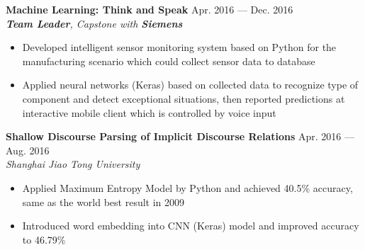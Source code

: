 \documentclass[margin,line,letterpaper]{res}
\begin{document}
\begin{resume}
{
\small
{\bf Machine Learning: Think and Speak} \hfill Apr. 2016 --- Dec. 2016\\
{\it \textbf{Team Leader}, Capstone with {\bf Siemens}}
}
\begin{itemize}
\setlength{\itemsep}{0pt}
\setlength{\parskip}{0pt}
\setlength{\parsep}{0pt}
\item {\small Developed intelligent sensor monitoring system based on Python for the manufacturing scenario which could collect sensor data to database}
\item {\small Applied neural networks (Keras) based on collected data to recognize type of component and detect exceptional situations, then reported predictions at interactive mobile client which is controlled by voice input}
\end{itemize}
\vspace{-.1 in}
{
\small
{\bf Shallow Discourse Parsing of Implicit Discourse Relations} \hfill Apr. 2016 ---  Aug. 2016\\
{\it Shanghai Jiao Tong University}
}
\begin{itemize}
\setlength{\itemsep}{0pt}
\setlength{\parskip}{0pt}
\setlength{\parsep}{0pt}
\item {\small Applied Maximum Entropy Model by Python and achieved 40.5\% accuracy, same as the world best result in 2009}
\item {\small Introduced word embedding into CNN (Keras) model and improved accuracy to 46.79\%}
\end{itemize}
\vspace{-.1 in}


\end{resume}
\end{document}

